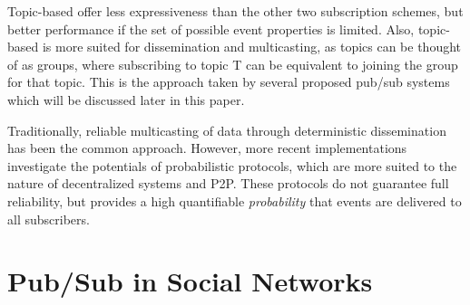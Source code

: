 Topic-based offer less expressiveness than the other two subscription
schemes, but better performance if the set of possible event properties
is limited. Also, topic-based is more suited for dissemination and
multicasting, as topics can be thought of as groups, where subscribing
to topic T can be equivalent to joining the group for that topic. This
is the approach taken by several proposed pub/sub systems which will be
discussed later in this paper.

Traditionally, reliable multicasting of data through deterministic
dissemination has been the common approach. However, more recent
implementations investigate the potentials of probabilistic protocols,
which are more suited to the nature of decentralized systems and P2P.
These protocols do not guarantee full reliability, but provides a high
quantifiable \emph{probability} that events are delivered to all
subscribers.

\section{Pub/Sub in Social Networks}
